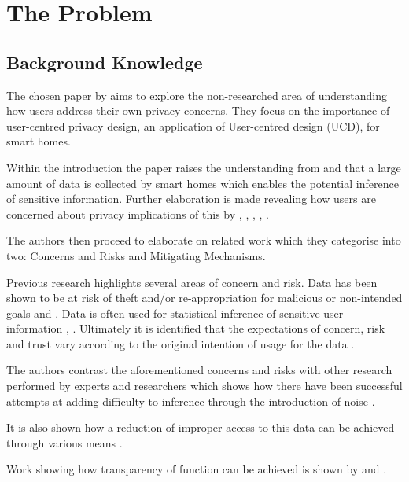 \section{The Problem}

\subsection{Background Knowledge}

The chosen paper by \textcite{Yao:2019:DMC:3290605.3300428} aims to explore the non-researched area of understanding how users address their own privacy concerns. They focus on the importance of user-centred privacy design, an application of User-centred design (UCD), for smart homes. 


Within the introduction the paper raises the understanding from \textcite{9} and \textcite{28} that a large amount of data is collected by smart homes which enables the potential inference of sensitive information. Further elaboration is made revealing how users are concerned about privacy implications of this by \textcite{6}, \textcite{40}, \textcite{42}, \textcite{18}, \textcite{21}.

The authors then proceed to elaborate on related work which they categorise into two: Concerns and Risks and Mitigating Mechanisms.

Previous research highlights several areas of concern and risk.
Data has been shown to be at risk of theft and/or re-appropriation for malicious or non-intended goals \parencite{3} \parencite{1} and \parencite{2}. Data is often used for statistical inference of sensitive user information \parencite{45}, \parencite{6} \parencite{42}. Ultimately it is identified that the expectations of concern, risk and trust vary according to the original intention of usage for the data \parencite{40} \parencite{43}.

The authors contrast the aforementioned concerns and risks with other research performed by experts and researchers which shows how there have been successful attempts at adding difficulty to inference through the introduction of noise \parencite{2} \parencite{11} \parencite{41} \parencite{39}.

It is also shown how a reduction of improper access to this data can be achieved through various means \parencite{29} \parencite{3} \parencite{8}.

Work showing how transparency of function can be achieved is shown by \textcite{10} and \textcite{26}.

